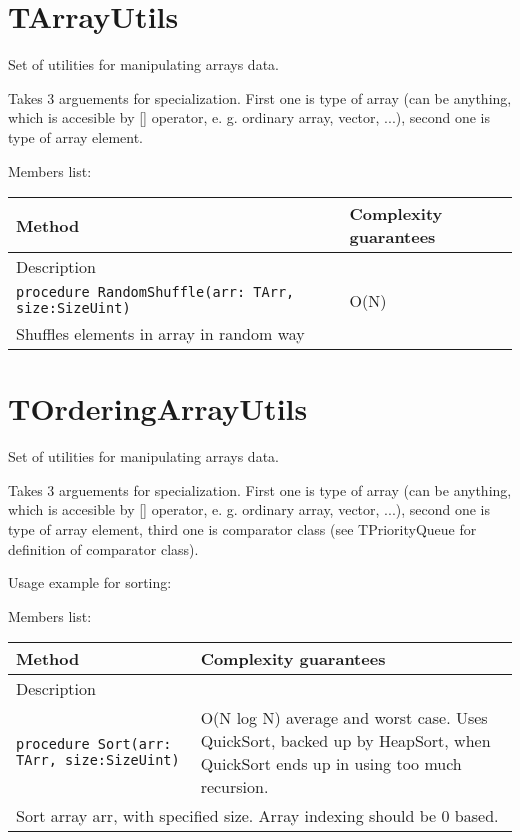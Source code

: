 \chapter{TArrayUtils}

Set of utilities for manipulating arrays data.

Takes 3 arguements for specialization. First one is type of array (can be anything, which is
accesible by [] operator, e. g. ordinary array, vector, ...), second one is type of array element.


%

Members list:

\begin{longtable}{|m{10cm}|m{5cm}|}
\hline
Method & Complexity guarantees \\ \hline
\multicolumn{2}{|m{15cm}|}{Description} \\ \hline\hline

\verb!procedure RandomShuffle(arr: TArr, size:SizeUint)! &
O(N)\\ \hline
\multicolumn{2}{|m{15cm}|}{Shuffles elements in array in random way} \\\hline\hline

\end{longtable}\chapter{TOrderingArrayUtils}

Set of utilities for manipulating arrays data.

Takes 3 arguements for specialization. First one is type of array (can be anything, which is
accesible by [] operator, e. g. ordinary array, vector, ...), second one is type of array element,
third one is comparator class (see TPriorityQueue for definition of comparator class).

Usage example for sorting:



Members list:

\begin{longtable}{|m{10cm}|m{5cm}|}
\hline
Method & Complexity guarantees \\ \hline
\multicolumn{2}{|m{15cm}|}{Description} \\ \hline\hline

\verb!procedure Sort(arr: TArr, size:SizeUint)! &
O(N log N) average and worst case. Uses QuickSort, backed up by HeapSort, when QuickSort ends up in
using too much recursion.\\ \hline
\multicolumn{2}{|m{15cm}|}{Sort array arr, with specified size. Array indexing should be 0 based.} \\\hline\hline

\end{longtable}
